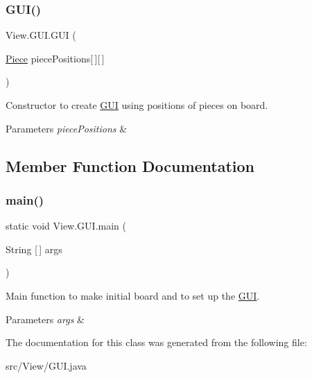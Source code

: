 \subsubsection{\texorpdfstring{G\+U\+I()}{GUI()}}
{\footnotesize\ttfamily View.\+G\+U\+I.\+G\+UI (\begin{DoxyParamCaption}\item[{\hyperlink{class_model_1_1_pieces_1_1_piece}{Piece}}]{piece\+Positions\mbox{[}$\,$\mbox{]}\mbox{[}$\,$\mbox{]} }\end{DoxyParamCaption})}

Constructor to create \hyperlink{class_view_1_1_g_u_i}{G\+UI} using positions of pieces on board. 
\begin{DoxyParams}{Parameters}
{\em piece\+Positions} & \\
\hline
\end{DoxyParams}


\subsection{Member Function Documentation}
\hypertarget{class_view_1_1_g_u_i_ab66997d351c41f53de8f3ee0ba838748}{}\label{class_view_1_1_g_u_i_ab66997d351c41f53de8f3ee0ba838748} 
\subsubsection{\texorpdfstring{main()}{main()}}
{\footnotesize\ttfamily static void View.\+G\+U\+I.\+main (\begin{DoxyParamCaption}\item[{String \mbox{[}$\,$\mbox{]}}]{args }\end{DoxyParamCaption})\hspace{0.3cm}{\ttfamily [static]}}

Main function to make initial board and to set up the \hyperlink{class_view_1_1_g_u_i}{G\+UI}. 
\begin{DoxyParams}{Parameters}
{\em args} & \\
\hline
\end{DoxyParams}


The documentation for this class was generated from the following file\+:\begin{DoxyCompactItemize}
\item 
src/\+View/G\+U\+I.\+java\end{DoxyCompactItemize}

